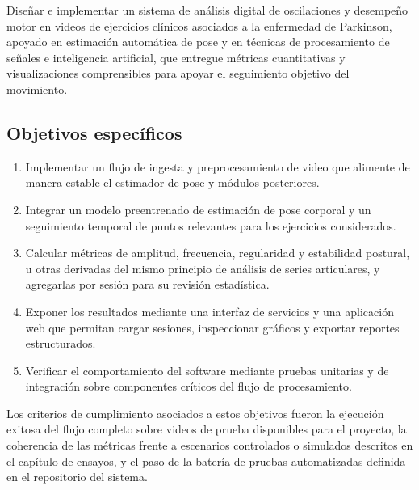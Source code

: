 Diseñar e implementar un sistema de análisis digital de oscilaciones y desempeño motor en videos de ejercicios clínicos asociados a la enfermedad de Parkinson, apoyado en estimación automática de pose y en técnicas de procesamiento de señales e inteligencia artificial, que entregue métricas cuantitativas y visualizaciones comprensibles para apoyar el seguimiento objetivo del movimiento.

\subsection{Objetivos específicos}

\begin{enumerate}
\item Implementar un flujo de ingesta y preprocesamiento de video que alimente de manera estable el estimador de pose y módulos posteriores.
\item Integrar un modelo preentrenado de estimación de pose corporal y un seguimiento temporal de puntos relevantes para los ejercicios considerados.
\item Calcular métricas de amplitud, frecuencia, regularidad y estabilidad postural, u otras derivadas del mismo principio de análisis de series articulares, y agregarlas por sesión para su revisión estadística.
\item Exponer los resultados mediante una interfaz de servicios y una aplicación web que permitan cargar sesiones, inspeccionar gráficos y exportar reportes estructurados.
\item Verificar el comportamiento del software mediante pruebas unitarias y de integración sobre componentes críticos del flujo de procesamiento.
\end{enumerate}

Los criterios de cumplimiento asociados a estos objetivos fueron la ejecución exitosa del flujo completo sobre videos de prueba disponibles para el proyecto, la coherencia de las métricas frente a escenarios controlados o simulados descritos en el capítulo de ensayos, y el paso de la batería de pruebas automatizadas definida en el repositorio del sistema.
